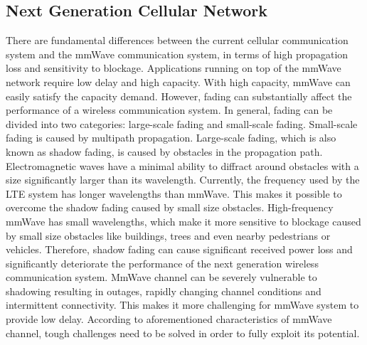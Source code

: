 \subsection{Next Generation Cellular Network}
\label{subsec:1}
\par There are fundamental differences between the current cellular communication system and the mmWave communication system, in terms of high propagation loss and sensitivity to blockage. Applications running on top of the mmWave network require low delay and high capacity. With high capacity, mmWave can easily satisfy the capacity demand. However, fading can substantially affect the performance of a wireless communication system. In general, fading can be divided into two categories: large-scale fading and small-scale fading. Small-scale fading is caused by multipath propagation. Large-scale fading, which is also known as shadow fading, is caused by obstacles in the propagation path. Electromagnetic waves have a minimal ability to diffract around obstacles with a size significantly larger than its wavelength. Currently, the frequency used by the LTE system has longer wavelengths than mmWave. This makes it possible to overcome the shadow fading caused by small size obstacles. High-frequency mmWave has small wavelengths, which make it more sensitive to blockage caused by small size obstacles like buildings, trees and even nearby pedestrians or vehicles. Therefore, shadow fading  can cause significant received power loss and significantly deteriorate the performance of the next generation wireless communication system. MmWave channel can be severely vulnerable to shadowing resulting in outages, rapidly changing channel conditions and intermittent connectivity. This makes it more challenging for mmWave system to provide low delay. According to aforementioned characteristics of mmWave channel, tough challenges need to be solved in order to fully exploit its potential. 


